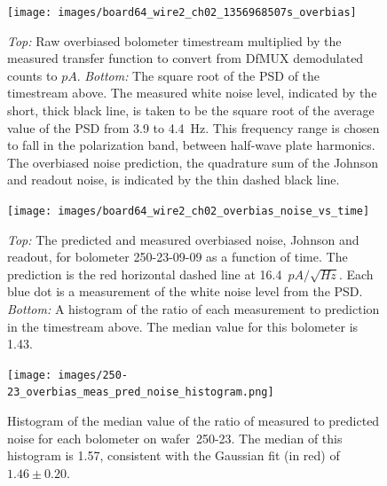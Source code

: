 \begin{figure}[ht!]
\begin{center}
\texttt{[image: images/board64\_wire2\_ch02\_1356968507s\_overbias]}
\caption{{\it Top:} Raw overbiased bolometer timestream multiplied by the measured transfer function to convert from \ac{DfMUX} demodulated counts to $pA$. {\it Bottom:} The square root of the \ac{PSD} of the timestream above. The measured white noise level, indicated by the short, thick black line, is taken to be the square root of the average value of the \ac{PSD} from 3.9 to 4.4~Hz. This frequency range is chosen to fall in the polarization band, between half-wave plate harmonics. The overbiased noise prediction, the quadrature sum of the Johnson and readout noise, is indicated by the thin dashed black line. }
\label{fig:one_bolo_overbias_noise}
\end{center}
\end{figure}

\begin{figure}[ht!]
\begin{center}
\texttt{[image: images/board64\_wire2\_ch02\_overbias\_noise\_vs\_time]}
\caption{{\it Top:} The predicted and measured overbiased noise, Johnson and readout, for bolometer 250-23-09-09 as a function of time. The prediction is the red horizontal dashed line at 16.4~$pA/\sqrt{Hz}$. Each blue dot is a measurement of the white noise level from the \ac{PSD}. {\it Bottom:} A histogram of the ratio of each measurement to prediction in the timestream above. The median value for this bolometer is 1.43.}
\label{fig:one_bolo_overbias_noise_vs_time}
\end{center}
\end{figure}

\begin{figure}[ht!]
\begin{center}
\texttt{[image: images/250-23\_overbias\_meas\_pred\_noise\_histogram.png]}
\caption{Histogram of the median value of the ratio of measured to predicted noise for each bolometer on wafer~250-23. The median of this histogram 
is 1.57, consistent with the Gaussian fit (in red) of $1.46 \pm 0.20$.}
\label{fig:250-23_overbias_hist}
\end{center}
\end{figure}


